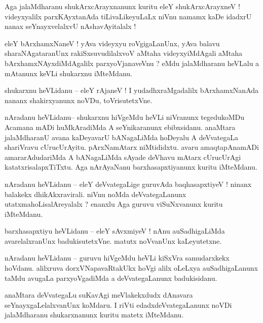 \documentclass{article}
\begin{document}
\begin{mn}%
Aga jalaMdharanu shukArxcArayxnanunx kuritu eleY shukArxcArayxneV ! videyxyalilx 
parxKAyxtanAda tiLivaLikeyuLaLx niVnu namamx kaDe idadxrU nanax seYnayxvelalxvU 
nAshavAyitalalx !
\end{mn}

\begin{mn}%
eleY bArxhamxNaneV ! yAva videyxyu roVgigaLanUnx, yAva balavu sharaNAgataranUnx 
rakiSxsuvudilalxvoV aMtaha videyxyiMdAgali aMtaha bArxhamxNAyxdiMdAgalilx parxyoVjanaveVnu ? 
eMdu jalaMdharanu heVLalu a mAtanunx keVLi shukarxnu iMteMdanu.
\end{mn}

\begin{mn}%
shukarxnu heVLidanu -- eleY rAjaneV ! I yudadhxraMgadalilx bArxhamxNanAda nananx 
shakirxyanunx noVDu, toVrisutetxVne.
\end{mn}

\begin{mn}%
nAradanu heVLidanu-- shukarxnu hiVgeMdu heVLi niVranunx tegedukoMDu Acamana mADi 
huMkAradiMda A seYnikaranunx ebibxsidanu. anaMtara jalaMdharanU avana kaDeyavarU bANagaLiMda 
hoDeyalu A deVvategaLa shariVravu cUrucUrAyitu. pArxNamAtarx niMtididxtu. avaru 
amaqtapAnamADi amararAdudariMda A bANagaLiMda sAyade deVhavu mAtarx cUrucUrAgi 
katatxrisalapxTiTxtu. Aga nArAyaNanu barxhasapxtiyanunx kuritu iMteMdanu. 
\end{mn}

\begin{mn}%
nAradanu heVLidanu -- eleY deVvategaLige guruvAda baqhasapxtiyeV ! ninanx balakekx 
dhikAkxravirali. niVnu noMda deVvategaLanunx utatxmahoLisalAreyalalx ? enanxlu Aga guruvu 
viSuNxvanunx kuritu iMteMdanu.
\end{mn}

\begin{mn}%
barxhasapxtiyu heVLidanu -- eleY sAvxmiyeV ! nAnu auSadhigaLiMda avarelalxranUnx 
badukisutetxVne. matutx noVvanUnx kaLeyutetxne.
\end{mn}

\begin{mn}%
nAradanu heVLidanu -- guruvu hiVgeMdu heVLi kiSxVra samudarxkekx hoVdanu. alilxruva 
dorxVNapavaRtakUkx hoVgi alilx oLeLxya auSadhigaLanunx taMdu avugaLa parxyoVgadiMda a 
deVvategaLanunx badukisidanu.
\end{mn}

\begin{mn}%
anaMtara deVvategaLu suKavAgi meVlakekxdudx dAnavara seYnayxgaLelalxvanUnx koMdaru. I riVti 
edadxdeVvategaLanunx noVDi jalaMdharanu shukarxnanunx kuritu matetx iMteMdanu.
\end{mn}
\end{document}
